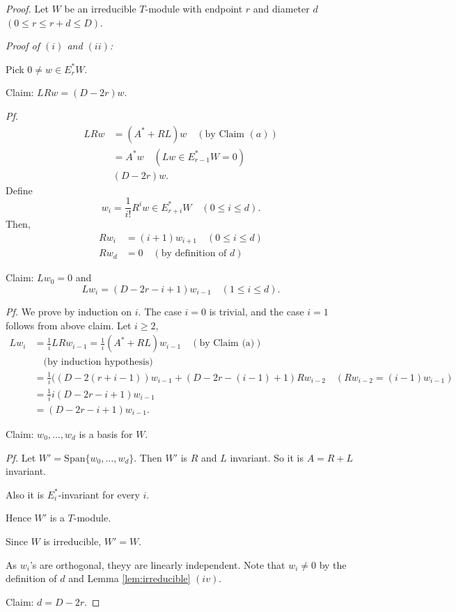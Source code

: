 \documentclass[
]{book}
\theoremstyle{definition}
\theoremstyle{definition}
\theoremstyle{definition}
\theoremstyle{definition}
\theoremstyle{remark}
\begin{document}
\begin{proof}
Let \(W\) be an irreducible \(T\)-module with endpoint \(r\) and diameter \(d\) \((0\leq r \leq r+d \leq D)\).

\emph{Proof of \((i)\) and \((ii)\):}

Pick \(0\neq w \in E^*_rW\).

Claim: \(LRw = (D-2r)w\).

\emph{Pf.}
\begin{align} 
LRw & = (A^*+RL)w \quad (\text{by Claim }(a))\\
& = A^*w \quad (Lw \in E^*_{r-1}W = 0)\\
& (D-2r)w.
\end{align}
Define
\[w_i = \frac{1}{i!}R^iw \in E^*_{r+i}W \quad (0\leq i \leq d).\]
Then,
\begin{align}
Rw_i & = (i+1)w_{i+1}\quad (0\leq i \leq d)\\
Rw_d & = 0 \quad (\text{by definition of }d)
\end{align}

Claim: \(Lw_0 = 0\) and
\[Lw_i = (D-2r-i+1)w_{i-1} \quad (1\leq i\leq d).\]

\emph{Pf.} We prove by induction on \(i\).
The case \(i=0\) is trivial, and the case \(i=1\) follows from above claim.
Let \(i\geq 2\),
\begin{align}
Lw_i & = \frac{1}{i}LRw_{i-1} = \frac{1}{i}(A^*+RL)w_{i-1} \quad (\text{by Claim (a)})\\
& \quad \text{(by induction hypothesis)}\\
& = \frac{1}{i}((D-2(r+i-1))w_{i-1} + (D-2r-(i-1)+1)Rw_{i-2} \quad (Rw_{i-2} = (i-1)w_{i-1})\\
& = \frac{1}{i}i(D-2r-i+1)w_{i-1}\\
& = (D-2r-i+1)w_{i-1}.
\end{align}

Claim: \(w_0, \ldots, w_d\) is a basis for \(W\).

\emph{Pf.}
Let \(W' = \mathrm{Span}\{w_0, \ldots, w_d\}\). Then \(W'\) is \(R\) and \(L\) invariant. So it is \(A = R+L\) invariant.

Also it is \(E^*_i\)-invariant for every \(i\).

Hence \(W'\) is a \(T\)-module.

Since \(W\) is irreducible, \(W' = W\).

As \(w_i\)'s are orthogonal, theyy are linearly independent. Note that \(w_i\neq 0\) by the definition of \(d\) and Lemma \ref{lem:irreducible} \((iv)\).

Claim: \(d = D-2r\).


\end{proof}
\end{document}
